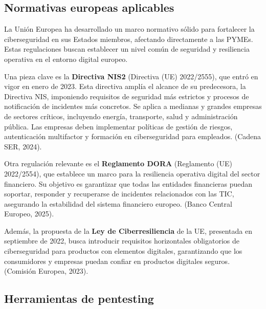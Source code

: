 \documentclass[a4paper, 10pt]{article}
\begin{document}
\subsection{Normativas europeas aplicables}

    La Unión Europea ha desarrollado un marco normativo sólido para fortalecer la ciberseguridad en sus Estados miembros, afectando directamente a las PYMEs. Estas regulaciones buscan establecer un nivel común de seguridad y resiliencia operativa en el entorno digital europeo.
    \par\vspace{0.5cm}

    Una pieza clave es la \textbf{Directiva NIS2} (Directiva (UE) 2022/2555), que entró en vigor en enero de 2023. Esta directiva amplía el alcance de su predecesora, la Directiva NIS, imponiendo requisitos de seguridad más estrictos y procesos de notificación de incidentes más concretos. Se aplica a medianas y grandes empresas de sectores críticos, incluyendo energía, transporte, salud y administración pública. Las empresas deben implementar políticas de gestión de riesgos, autenticación multifactor y formación en ciberseguridad para empleados. (Cadena SER, 2024). \cite{cadena_ser}
    \par\vspace{0.5cm}

    Otra regulación relevante es el \textbf{Reglamento DORA} (Reglamento (UE) 2022/2554), que establece un marco para la resiliencia operativa digital del sector financiero. Su objetivo es garantizar que todas las entidades financieras puedan soportar, responder y recuperarse de incidentes relacionados con las TIC, asegurando la estabilidad del sistema financiero europeo. (Banco Central Europeo, 2025). \cite{bce}
    \par\vspace{0.5cm}

    Además, la propuesta de la \textbf{Ley de Ciberresiliencia} de la UE, presentada en septiembre de 2022, busca introducir requisitos horizontales obligatorios de ciberseguridad para productos con elementos digitales, garantizando que los consumidores y empresas puedan confiar en productos digitales seguros. (Comisión Europea, 2023). \cite{comision_europea}
    

    

    \subsection{Herramientas de pentesting}
\end{document}
